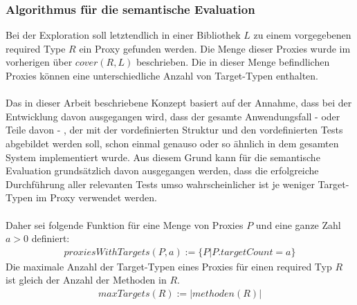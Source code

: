 \documentclass[a4paper,12pt]{article}
\begin{document}
\subsubsection{Algorithmus für die semantische Evaluation}
Bei der Exploration soll letztendlich in einer Bibliothek $L$ zu einem vorgegebenen required Type $R$ ein Proxy gefunden werden. Die Menge dieser Proxies wurde im vorherigen über $\mathit{cover(R,L)}$ beschrieben. Die in dieser Menge befindlichen Proxies können eine unterschiedliche Anzahl von Target-Typen enthalten.\\\\
Das in dieser Arbeit beschriebene Konzept basiert auf der Annahme, dass bei der Entwicklung davon ausgegangen wird, dass der gesamte Anwendungsfall - oder Teile davon - , der mit der vordefinierten Struktur und den vordefinierten Tests abgebildet werden soll, schon einmal genauso oder so ähnlich in dem gesamten System implementiert wurde. Aus diesem Grund kann für die semantische Evaluation grundsätzlich davon ausgegangen werden, dass die erfolgreiche Durchführung aller relevanten Tests umso wahrscheinlicher ist je weniger Target-Typen im Proxy verwendet werden.\\\\
Daher sei folgende Funktion für eine Menge von Proxies $P$ und eine ganze Zahl $a > 0$ definiert:
\begin{gather*}
\mathit{proxiesWithTargets(P,a)} := \{P | P.targetCount = a\}
\end{gather*}
Die maximale Anzahl der Target-Typen eines Proxies für einen required Typ $R$ ist gleich der Anzahl der Methoden in $R$.
\begin{gather*}
\mathit{maxTargets(R)} := |\mathit{methoden(R)}|
\end{gather*}
\end{document}
